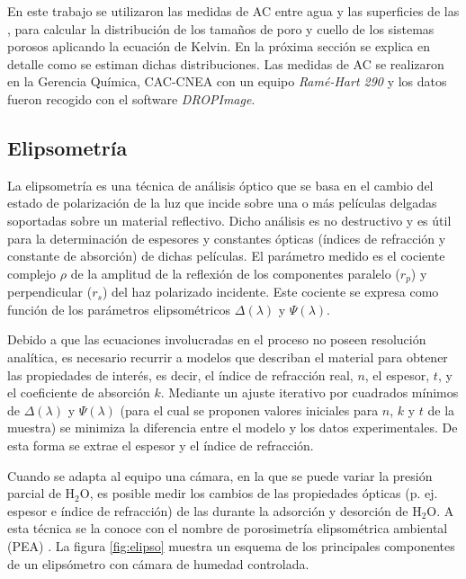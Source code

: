 		En este trabajo se utilizaron las medidas de AC entre agua y las superficies de las \pdm, para calcular la distribución de los tamaños de poro y cuello de los sistemas porosos aplicando la ecuación de Kelvin.\cite{Boissiere2005} En la próxima sección se explica en detalle como se estiman dichas distribuciones.
		Las medidas de AC se realizaron en la Gerencia Química, CAC-CNEA con un equipo \textit{Ramé-Hart 290} y los datos fueron recogido con el software \textit{DROPImage}.

	\subsection{Elipsometría}\label{sec:elipso}

		La elipsometría es una técnica de análisis óptico que se basa en el cambio del estado de polarización de la luz que incide sobre una o más películas delgadas soportadas sobre un material reflectivo. Dicho análisis es no destructivo y es útil para la determinación de espesores y constantes ópticas (índices de refracción y constante de absorción) de dichas películas.\cite{TompkinsHarlandG.1999,Rothen1945} El parámetro medido es el cociente complejo $\rho$ de la amplitud de la reflexión de los componentes paralelo ($r_p$) y perpendicular ($r_s$) del haz polarizado incidente. Este cociente se expresa como función de los parámetros elipsométricos $\Delta(\lambda)$ y $\Psi(\lambda)$. 

		Debido a que las ecuaciones involucradas en el proceso no poseen resolución analítica, es necesario recurrir a modelos que describan el material para obtener las propiedades de interés, es decir, el índice de refracción real, $n$, el espesor, $t$, y el coeficiente de absorción $k$. Mediante un ajuste iterativo por cuadrados mínimos de $\Delta(\lambda)$ y $\Psi(\lambda)$ (para el cual se proponen valores iniciales para $n$, $k$ y $t$ de la muestra) se minimiza la diferencia entre el modelo y los datos experimentales. De esta forma se extrae el espesor y el índice de refracción. \cite{TompkinsHarlandG.1999}

		Cuando se adapta al equipo una cámara, en la que se puede variar la presión parcial de H$_2$O, es posible medir los cambios de las propiedades ópticas (p. ej. espesor e índice de refracción) de las \pdm\space durante la adsorción y desorción de H$_2$O. A esta técnica se la conoce con el nombre de porosimetría elipsométrica ambiental (PEA) \cite{Boissiere2005}. La figura \ref{fig:elipso} muestra un esquema de los principales componentes de un elipsómetro con cámara de humedad controlada.

